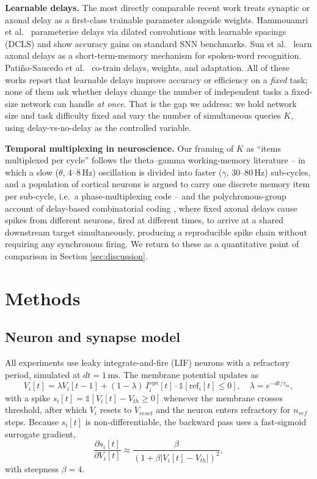 \documentclass[conference]{IEEEtran}
\begin{document}
\textbf{Learnable delays.} The most directly comparable recent work treats synaptic or
axonal delay as a first-class trainable parameter alongside weights. Hammouamri et
al.\ \cite{hammouamri2024learning} parameterise delays via dilated convolutions with
learnable spacings (DCLS) and show accuracy gains on standard SNN benchmarks. Sun et
al.\ \cite{sun2022axonal,sun2023adaptive} learn axonal delays as a short-term-memory
mechanism for spoken-word recognition. Pati\~no-Saucedo et al.\ \cite{patino2024colearning}
co-train delays, weights, and adaptation. All of these works report that learnable delays
improve accuracy or efficiency on a \emph{fixed} task; none of them ask whether delays
change the number of independent tasks a fixed-size network can handle \emph{at once}.
That is the gap we address: we hold network size and task difficulty fixed and vary the
number of simultaneous queries $K$, using delay-vs-no-delay as the controlled variable.

\textbf{Temporal multiplexing in neuroscience.} Our framing of $K$ as ``items
multiplexed per cycle'' follows the theta--gamma working-memory literature
\cite{lisman1995storage,cowan2001magical} -- in which a slow ($\theta$, 4--8\,Hz)
oscillation is divided into faster ($\gamma$, 30--80\,Hz) sub-cycles, and a population of
cortical neurons is argued to carry one discrete memory item per sub-cycle, i.e.\ a
phase-multiplexing code -- and the polychronous-group account of delay-based
combinatorial coding \cite{izhikevich2006polychronization}, where fixed axonal delays
cause spikes from different neurons, fired at different times, to arrive at a shared
downstream target simultaneously, producing a reproducible spike chain without requiring
any synchronous firing. We return to these as a quantitative point of comparison in
Section \ref{sec:discussion}.

\section{Methods}

\subsection{Neuron and synapse model}
All experiments use leaky integrate-and-fire (LIF) neurons with a refractory period,
simulated at $dt{=}1\,\mathrm{ms}$. The membrane potential updates as
\begin{equation}
V_i[t] = \lambda V_i[t-1] + (1-\lambda)\,I_i^{syn}[t]\cdot\mathbb{1}[\text{ref}_i[t]\leq0],
\quad \lambda = e^{-dt/\tau_m},
\label{eq:lif}
\end{equation}
with a spike $s_i[t]=\mathbb{1}[V_i[t]-V_{th}\geq0]$ whenever the membrane crosses
threshold, after which $V_i$ resets to $V_{reset}$ and the neuron enters refractory for
$n_{ref}$ steps. Because $s_i[t]$ is non-differentiable, the backward pass uses a
fast-sigmoid surrogate gradient,
\begin{equation}
\frac{\partial s_i[t]}{\partial V_i[t]} \approx \frac{\beta}{(1+\beta|V_i[t]-V_{th}|)^2},
\label{eq:surrogate}
\end{equation}
with steepness $\beta{=}4$.
\end{document}
